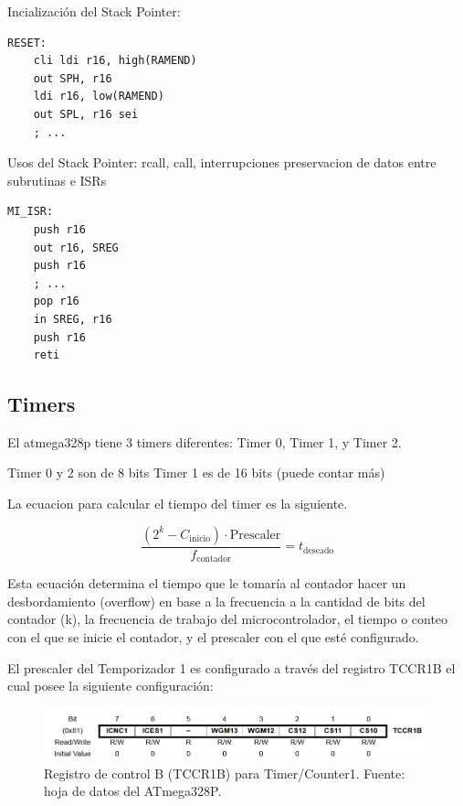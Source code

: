 Incialización del Stack Pointer:

\begin{verbatim}
RESET:
    cli ldi r16, high(RAMEND)
    out SPH, r16
    ldi r16, low(RAMEND)
    out SPL, r16 sei
    ; ...
\end{verbatim}

Usos del Stack Pointer: rcall, call, interrupciones
preservacion de datos entre subrutinas e ISRs

\begin{verbatim}
MI_ISR:
    push r16
    out r16, SREG
    push r16
    ; ... 
    pop r16
    in SREG, r16
    push r16
    reti
\end{verbatim}

\subsection{Timers}
El atmega328p tiene 3 timers diferentes: Timer 0, Timer 1, y Timer 2.

Timer 0 y 2 son de 8 bits
Timer 1 es de 16 bits (puede contar más)

La ecuacion para calcular el tiempo del timer es la siguiente.

\begin{equation}
    \frac{(2^{k} - C_{\text{inicio}})\cdot \text{Prescaler}}{f_{\text{contador}}} = t_{\text{deseado}}
\end{equation}

Esta ecuación determina el tiempo que le tomaría al contador hacer un desbordamiento (overflow) en base a la frecuencia a la cantidad de bits del contador (k), la frecuencia de trabajo del microcontrolador, el tiempo o conteo con el que se inicie el contador, y el prescaler con el que esté configurado.

El prescaler del Temporizador 1 es configurado a través del registro TCCR1B el cual posee la siguiente configuración:

\begin{figure}[H]
  \centering
  \includegraphics[width=\linewidth]{./Anexos/Marco Teorico/Timers/TCCR1B.png}
  \caption{Registro de control B (TCCR1B) para Timer/Counter1. Fuente: hoja de datos del ATmega328P\@\cite{atmega328p_datasheet}.}
  \label{fig:TCCR1B}
\end{figure}

